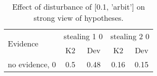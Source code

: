 \begin{table}\begin{tabular}{l|cc|cc}\toprule\multirow{2}{*}{Evidence} & \multicolumn{2}{c}{stealing 1 0}& \multicolumn{2}{c}{stealing 2 0}\\& {K2} & {Dev}& {K2} & {Dev}\\\midrule
no evidence, 0 & 0.5&0.48&0.16&0.15\\\bottomrule\end{tabular}\caption{Effect of disturbance of [0.1, 'arbit'] on strong view of hypotheses.}\end{table}